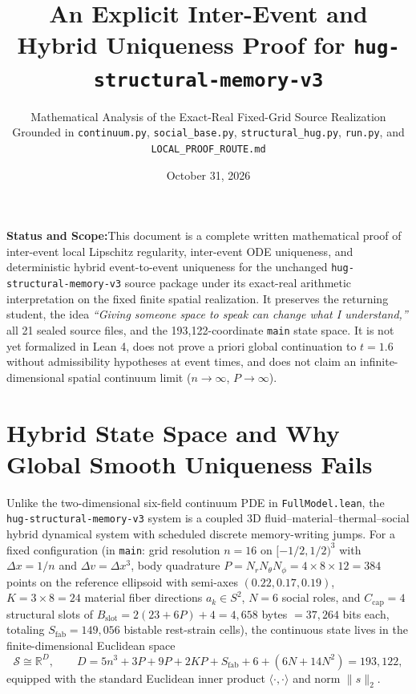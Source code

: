 \documentclass[11pt,a4paper]{article}
\title{\textbf{\color{primary}An Explicit Inter-Event and Hybrid Uniqueness Proof for \texttt{hug-structural-memory-v3}}}
\author{Mathematical Analysis of the Exact-Real Fixed-Grid Source Realization\\
\small Grounded in \texttt{continuum.py}, \texttt{social\_base.py}, \texttt{structural\_hug.py}, \texttt{run.py}, and \texttt{LOCAL\_PROOF\_ROUTE.md}}
\date{October 31, 2026}
\newcommand{\takeaway}[2]{%
  \vspace{6pt}\noindent\colorbox{primary!8}{%
    \parbox{\dimexpr\textwidth-2\fboxsep\relax}{%
      \vspace{3pt}\textbf{\color{primary}#1:}\hspace{0.5em}#2\vspace{3pt}%
    }%
  }\vspace{6pt}%
}
\theoremstyle{definition}
\begin{document}
\maketitle

\takeaway{Status and Scope}{This document is a complete written mathematical proof of inter-event local Lipschitz regularity, inter-event ODE uniqueness, and deterministic hybrid event-to-event uniqueness for the unchanged \texttt{hug-structural-memory-v3} source package under its exact-real arithmetic interpretation on the fixed finite spatial realization. It preserves the returning student, the idea \emph{``Giving someone space to speak can change what I understand,''} all 21 sealed source files, and the 193,122-coordinate \texttt{main} state space. It is not yet formalized in Lean 4, does not prove a priori global continuation to $t=1.6$ without admissibility hypotheses at event times, and does not claim an infinite-dimensional spatial continuum limit ($n \to \infty$, $P \to \infty$).}

\section{Hybrid State Space and Why Global Smooth Uniqueness Fails}

Unlike the two-dimensional six-field continuum PDE in \texttt{FullModel.lean}, the \texttt{hug-structural-memory-v3} system is a coupled 3D fluid--material--thermal--social hybrid dynamical system with scheduled discrete memory-writing jumps. For a fixed configuration (in \texttt{main}: grid resolution $n=16$ on $[-1/2, 1/2)^3$ with $\Delta x = 1/n$ and $\Delta v = \Delta x^3$, body quadrature $P = N_r N_\theta N_\phi = 4 \times 8 \times 12 = 384$ points on the reference ellipsoid with semi-axes $(0.22, 0.17, 0.19)$, $K = 3 \times 8 = 24$ material fiber directions $a_k \in S^2$, $N = 6$ social roles, and $C_{\mathrm{cap}} = 4$ structural slots of $B_{\mathrm{slot}} = 2(23 + 6P) + 4 = 4,658$ bytes $= 37,264$ bits each, totaling $S_{\mathrm{fab}} = 149,056$ bistable rest-strain cells), the continuous state lives in the finite-dimensional Euclidean space
\begin{equation}
  \mathcal{S} \cong \mathbb{R}^{D}, \qquad D = 5n^3 + 3P + 9P + 2KP + S_{\mathrm{fab}} + 6 + (6N + 14N^2) = 193,122,
\end{equation}
equipped with the standard Euclidean inner product $\langle \cdot, \cdot \rangle$ and norm $\|s\|_2$.
\end{document}

